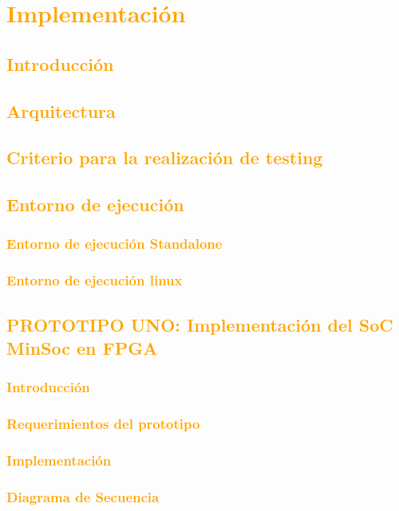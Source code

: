 \documentclass[a4paper,11pt]{article}
\begin{document}
\section{\textcolor{orange}{Implementación}}
	\subsection{\textcolor{orange}{Introducción}}
	\subsection{\textcolor{orange}{Arquitectura}}
	\subsection{\textcolor{orange}{Criterio para la realización de testing}}
	\subsection{\textcolor{orange}{Entorno de ejecución}}
		\subsubsection{\textcolor{orange}{Entorno de ejecución Standalone}}
		\subsubsection{\textcolor{orange}{Entorno de ejecución linux}}
	\subsection{\textcolor{orange}{PROTOTIPO UNO: Implementación del SoC MinSoc en FPGA}}
		\subsubsection{\textcolor{orange}{Introducción}}
		\subsubsection{\textcolor{orange}{Requerimientos del prototipo}}
		\subsubsection{\textcolor{orange}{Implementación}}
			\subsubsection{\textcolor{orange}{Diagrama de Secuencia}}
\end{document}
